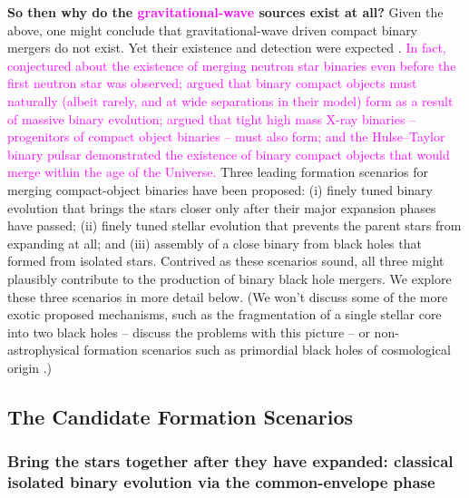 \documentclass[iop,onecolumn]{revtex4}
\newcommand{\ilya}[1]{\textcolor{magenta}{#1}}
\begin{document}
\textbf{So then why do the \ilya{gravitational-wave} sources exist at all?} Given the above, one might conclude that gravitational-wave driven compact binary mergers do not exist. Yet their existence and detection were expected \ilya{\citep{ratesdoc}}. \ilya{In fact, \citet{Dyson:1962} conjectured about the existence of merging neutron star binaries even before the first neutron star was observed; \citet{Tutukov:1973} argued that binary compact objects must naturally (albeit  rarely, and at wide separations in their model) form as a result of massive binary evolution; \citet{vdHDeLoore:1973} argued that tight high mass X-ray binaries -- progenitors of compact object binaries -- must also form; and the Hulse--Taylor binary pulsar demonstrated the existence of binary compact objects that would merge within the age of the Universe.}    Three leading formation scenarios for merging compact-object binaries have been proposed: (i) finely tuned binary evolution that brings the stars closer only after their major expansion phases have passed; (ii) finely tuned stellar evolution that prevents the parent stars from expanding at all; and (iii) assembly of a close binary from black holes that formed from isolated stars. Contrived as these scenarios sound, all three might plausibly contribute to the production of binary black hole mergers. We explore these three scenarios in more detail below. (We won't discuss some of the more exotic proposed mechanisms, such as the fragmentation of a single stellar core into two black holes \citep{Loeb:2016} -- \citet{Woosley:2016,Dai:2017} discuss the problems with this picture -- or non-astrophysical formation scenarios such as primordial black holes of cosmological origin \citep[e.g.,][]{Bird:2016}.)

\subsection{The Candidate Formation Scenarios}
\subsubsection{Bring the stars together after they have expanded: classical isolated binary evolution via the common-envelope phase}
\end{document}

